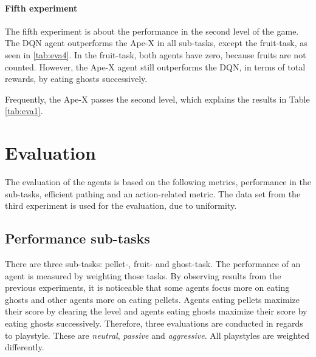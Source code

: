 \paragraph{Fifth experiment}
The fifth experiment is about the performance in the second level of the game. The DQN agent outperforms the Ape-X in all sub-tasks, except the fruit-task, as seen in \ref{tab:eva4}. In the fruit-task, both agents have zero, because fruits are not counted. However, the Ape-X agent still outperforms the DQN, in terms of total rewards, by eating ghosts successively.

\begin{table}[H]
	\caption[Average achieved results in the second level across 30 episodes] {Average achieved results in the second level across 30 episodes}
	\centering
	\label{tab:eva4}
\end{table} 
Frequently, the Ape-X passes the second level, which explains the results in Table \ref{tab:eva1}.

\section{Evaluation}
The evaluation of the agents is based on the following metrics, performance in the sub-tasks, efficient pathing and an action-related metric. The data set from the third experiment is used for the evaluation, due to uniformity. 

\subsection{Performance sub-tasks}
There are three sub-tasks: pellet-, fruit- and ghost-task. The performance of an agent is measured by weighting those tasks. By observing results from the previous experiments, it is noticeable that some agents focus more on eating ghosts and other agents more on eating pellets. Agents eating pellets maximize their score by clearing the level and agents eating ghosts maximize their score by eating ghosts successively. Therefore, three evaluations are conducted in regards to playstyle. These are \textit{neutral}, \textit{passive} and \textit{aggressive}. All playstyles are weighted differently.

